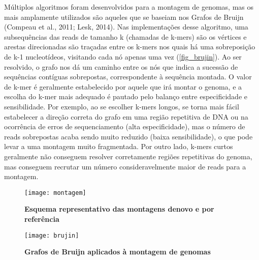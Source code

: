 \documentclass[../DISSERTACAO_MAIN.tex]{subfiles}
\begin{document}
Múltiplos algoritmos foram desenvolvidos para a montagem de genomas, mas os mais amplamente utilizados são aqueles que se baseiam nos Grafos de Bruijn (Compeau et al., 2011; Lesk, 2014). Nas implementações desse algoritmo, uma subsequências das reads de tamanho k (chamadas de k-mers) são os vértices e arestas direcionadas são traçadas entre os k-mers nos quais há uma sobreposição de k-1 nucleotídeos, visitando cada nó apenas uma vez (\autoref{fig_brujin}). Ao ser resolvido, o grafo nos dá um caminho entre os nós que indica a sucessão de sequências contíguas sobrepostas, correspondente à sequência montada. O valor de k-mer é geralmente estabelecido por aquele que irá montar o genoma, e a escolha do k-mer mais adequado é pautado pelo balanço entre especificidade e sensibilidade. Por exemplo, ao se escolher k-mers longos, se torna mais fácil estabelecer a direção correta do grafo em uma região repetitiva de DNA ou na ocorrência de erros de sequenciamento (alta especificidade), mas o número de reads sobrepostas acaba sendo muito reduzido (baixa sensibilidade), o que pode levar a uma montagem muito fragmentada. Por outro lado, k-mers curtos geralmente não conseguem resolver corretamente regiões repetitivas do genoma, mas conseguem recrutar um número consideravelmente maior de reads para a montagem.

\begin{figure}
	\texttt{[image: montagem]}
	\caption[Esquema representativo das montagens denovo e por referência]{\textbf{Esquema representativo das montagens denovo e por referência}}
	\label{fig_montagem}
\end{figure}

\begin{figure}
	\texttt{[image: brujin]}
	\caption[Grafos de Bruijn aplicados à montagem de genomas]{\textbf{Grafos de Bruijn aplicados à montagem de genomas}}
	\label{fig_brujin}
\end{figure}
\end{document}
